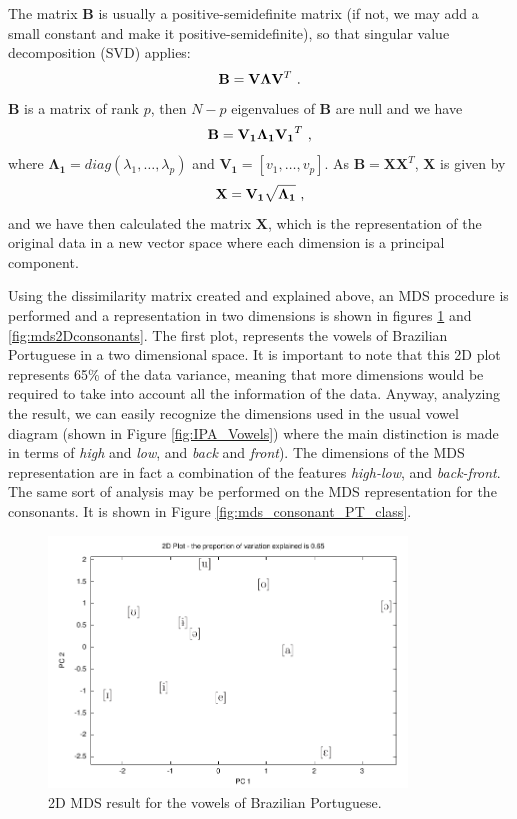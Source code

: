 The matrix $\mathbf{B}$ is usually a positive-semidefinite matrix (if not, we may add a small constant and make it positive-semidefinite), so that singular value decomposition (SVD) applies: 
\begin{equation}
\mathbf{B} = \mathbf{V} \mathbf{\Lambda} \mathbf{V}^T \textmd{ .} 
\end{equation}
$\mathbf{B}$ is a matrix of rank $p$, then $N-p$ eigenvalues of $\mathbf{B}$ are null and we have
\begin{equation}
\mathbf{B} = \mathbf{V_1} \mathbf{\Lambda_1} \mathbf{V_1}^T \textmd{ ,}
\end{equation}
where $\mathbf{\Lambda_1}=diag(\lambda_1,\ldots,\lambda_p)$ and $\mathbf{V_1} = [v_1,\ldots,v_p]$. As $\mathbf{B}=\mathbf{X} \mathbf{X}^T$, $\mathbf{X}$ is given by 
\begin{equation}
\mathbf{X} = \mathbf{V_1} \sqrt{\mathbf{\Lambda_1}} \textmd{ ,} 
\end{equation}
and we have then calculated the matrix $\mathbf{X}$, which is the representation of the original data in a new vector space where each dimension is a principal component.

Using the dissimilarity matrix created and explained above, an MDS procedure is performed and a representation in two dimensions is shown in figures \ref{fig:mds2Dvowels} and \ref{fig:mds2Dconsonants}. The first plot, represents the vowels of Brazilian Portuguese in a two dimensional space. It is important to note that this 2D plot represents 65\% of the data variance, meaning that more dimensions would be required to take into account all the information of the data. Anyway, analyzing the result, we can easily recognize the dimensions used in the usual vowel diagram (shown in Figure \ref{fig:IPA_Vowels}) where the main distinction is made in terms of \textit{high} and \textit{low}, and \textit{back} and \textit{front}). The dimensions of the MDS representation are in fact a combination of the features \textit{high-low}, and \textit{back-front}. The same sort of analysis may be performed on the MDS representation for the consonants. It is shown in Figure \ref{fig:mds_consonant_PT_class}.

\begin{figure}[h!]
\centering
\includegraphics[width=0.85\textwidth]{images/mds_vowelsPT.pdf}
\caption{2D MDS result for the vowels of Brazilian Portuguese.}
\label{fig:mds2Dvowels}
\end{figure}


